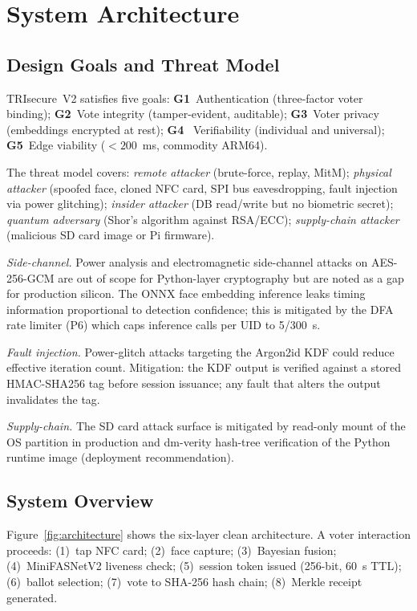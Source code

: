 \documentclass[pdflatex,sn-mathphys-num]{sn-jnl}%
\theoremstyle{thmstyleone}%
\theoremstyle{thmstyletwo}%
\theoremstyle{thmstylethree}%
\begin{document}
\section{System Architecture}\label{sec:architecture}

\subsection{Design Goals and Threat Model}

TRIsecure~V2 satisfies five goals: \textbf{G1}~Authentication (three-factor
voter binding); \textbf{G2}~Vote integrity (tamper-evident, auditable);
\textbf{G3}~Voter privacy (embeddings encrypted at rest); \textbf{G4}~
Verifiability (individual and universal); \textbf{G5}~Edge viability
(\(<200\)~ms, commodity ARM64).

The threat model covers: \textit{remote attacker} (brute-force, replay,
MitM); \textit{physical attacker} (spoofed face, cloned NFC card, SPI bus
eavesdropping, fault injection via power glitching); \textit{insider attacker}
(DB read/write but no biometric secret); \textit{quantum adversary} (Shor's
algorithm against RSA/ECC); \textit{supply-chain attacker} (malicious SD card
image or Pi firmware).

\textit{Side-channel.} Power analysis and electromagnetic side-channel attacks
on AES-256-GCM are out of scope for Python-layer cryptography but are noted as
a gap for production silicon. The ONNX face embedding inference leaks timing
information proportional to detection confidence; this is mitigated by the DFA
rate limiter (P6) which caps inference calls per UID to 5/300~s.

\textit{Fault injection.} Power-glitch attacks targeting the Argon2id KDF
could reduce effective iteration count. Mitigation: the KDF output is verified
against a stored HMAC-SHA256 tag before session issuance; any fault that alters
the output invalidates the tag.

\textit{Supply-chain.} The SD card attack surface is mitigated by read-only
mount of the OS partition in production and dm-verity hash-tree verification of
the Python runtime image (deployment recommendation).

\subsection{System Overview}

Figure~\ref{fig:architecture} shows the six-layer clean architecture. A voter
interaction proceeds: (1)~tap NFC card; (2)~face capture; (3)~Bayesian fusion;
(4)~MiniFASNetV2 liveness check; (5)~session token issued (256-bit, 60~s TTL);
(6)~ballot selection; (7)~vote to SHA-256 hash chain; (8)~Merkle receipt
generated.
\end{document}
